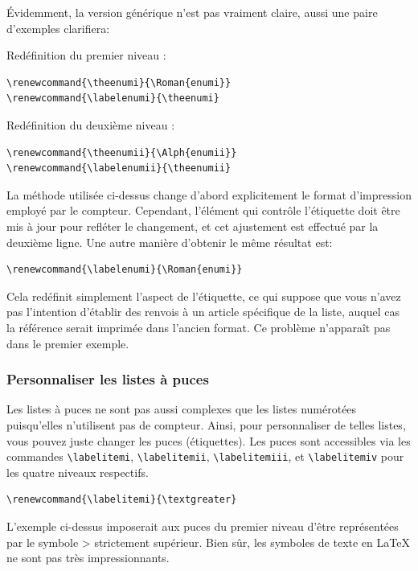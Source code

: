 \documentclass[a4paper,twoside]{article}
\begin{document}
Évidemment, la version générique n'est pas vraiment claire, aussi une paire d'exemples clarifiera:

Redéfinition du premier niveau :

\begin{verbatim}
\renewcommand{\theenumi}{\Roman{enumi}}
\renewcommand{\labelenumi}{\theenumi}
\end{verbatim}

Redéfinition du deuxième niveau :

\begin{verbatim}
\renewcommand{\theenumii}{\Alph{enumii}}
\renewcommand{\labelenumii}{\theenumii}
\end{verbatim}

La méthode utilisée ci-dessus change d'abord explicitement le format d'impression employé par le compteur. Cependant, l'élément qui contrôle l'étiquette doit être mis à jour pour refléter le changement, et cet ajustement est effectué par la deuxième ligne. Une autre manière d'obtenir le même résultat est:

\begin{verbatim}
\renewcommand{\labelenumi}{\Roman{enumi}}
\end{verbatim}

Cela redéfinit simplement l'aspect de l'étiquette, ce qui suppose que vous n'avez pas l'intention d'établir des renvois à un article spécifique de la liste, auquel cas la référence serait imprimée dans l'ancien format. Ce problème n'apparaît pas dans le premier exemple.

\subsubsection{Personnaliser les listes à puces}

Les listes à puces ne sont pas aussi complexes que les listes numérotées puisqu'elles n'utilisent pas de compteur. Ainsi, pour personnaliser de telles listes, vous pouvez juste changer les puces (étiquettes). Les puces sont accessibles via les commandes \verb|\labelitemi|, \verb|\labelitemii|, \verb|\labelitemiii|, et \verb|\labelitemiv| pour les quatre niveaux respectifs.

\begin{verbatim}
\renewcommand{\labelitemi}{\textgreater}
\end{verbatim}



L'exemple ci-dessus imposerait aux puces du premier niveau d'être représentées par le symbole \og > \fg strictement supérieur. Bien sûr, les symboles de texte en \LaTeX{} ne sont pas très impressionnants.
\end{document}
